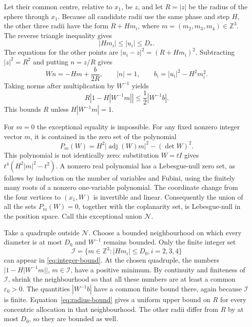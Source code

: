 \documentclass[11pt,a4paper]{article}
\numberwithin{equation}{section}
\theoremstyle{definition}
\theoremstyle{remark}
\DeclareMathOperator{\adj}{adj}
\begin{document}
Let their common centre, relative to $x_1$, be $z$, and let $R=|z|$ be
the radius of the sphere through $x_1$. Because all candidate radii use
the same phase and step $H$, the other three radii have the form
$R+Hm_i$, where $m=(m_2,m_3,m_4)\in\mathbb Z^3$. The reverse triangle
inequality gives
\begin{equation}
 |Hm_i|\leq|u_i|\leq D_*.
 \label{eq:integer-bound}
\end{equation}
The equations for the other points are
$|u_i-z|^2=(R+Hm_i)^2$. Subtracting $|z|^2=R^2$ and putting $n=z/R$
gives
\begin{equation}
 Wn=-Hm+\frac b{2R},\qquad |n|=1,
 \qquad b_i=|u_i|^2-H^2m_i^2.
 \label{eq:concentric-equations}
\end{equation}
Taking norms after multiplication by $W^{-1}$ yields
\begin{equation}
 R\left|1-H|W^{-1}m|\right|
 \leq\frac12|W^{-1}b|.
 \label{eq:radius-bound}
\end{equation}
This bounds $R$ unless $H|W^{-1}m|=1$.

For $m=0$ the exceptional equality is impossible. For any fixed nonzero
integer vector $m$, it is contained in the zero set of the polynomial
\begin{equation}
 P_m(W)=H^2|\adj(W)m|^2-(\det W)^2.
 \label{eq:resonance-polynomial}
\end{equation}
This polynomial is not identically zero: substitution $W=tI$ gives
$t^4(H^2|m|^2-t^2)$. A nonzero real polynomial has a Lebesgue-null zero
set, as follows by induction on the number of variables and Fubini,
using the finitely many roots of a nonzero one-variable polynomial.
The coordinate change from the four vertices to $(x_1,W)$ is invertible
and linear. Consequently the union of all the sets $P_m(W)=0$, together
with the coplanarity set, is Lebesgue-null in the position space.
Call this exceptional union $\mathcal N$.

Take a quadruple outside $\mathcal N$. Choose a bounded neighbourhood on
which every diameter is at most $D_0$ and $W^{-1}$ remains bounded. Only
the finite integer set
\[
 \mathcal I=\{m\in\mathbb Z^3: |Hm_i|\leq D_0, i=2,3,4\}
\]
can appear in \eqref{eq:integer-bound}. At the chosen quadruple, the
numbers $|1-H|W^{-1}m||$, $m\in\mathcal I$, have a positive minimum.
By continuity and finiteness of $\mathcal I$, shrink the neighbourhood
so that all these numbers are at least a common $\varepsilon_0>0$.
The quantities $|W^{-1}b|$ have a common finite bound there, again because
$\mathcal I$ is finite. Equation~\eqref{eq:radius-bound} gives a uniform
upper bound on $R$ for every concentric allocation in that neighbourhood.
The other radii differ from $R$ by at most $D_0$, so they are bounded
as well.
\end{document}
